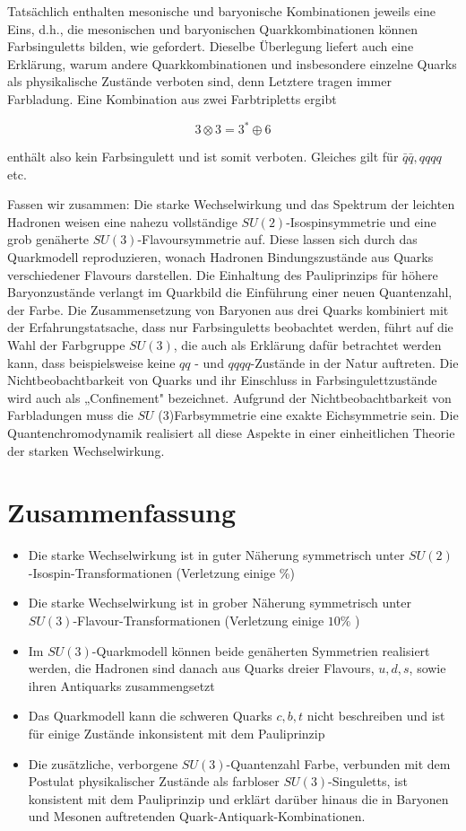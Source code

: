 \documentclass[10pt, letterpaper]{article}
\begin{document}
Tatsächlich enthalten mesonische und baryonische Kombinationen jeweils eine Eins, d.h., die mesonischen und baryonischen Quarkkombinationen können Farbsinguletts bilden, wie gefordert. Dieselbe Überlegung liefert auch eine Erklärung, warum andere Quarkkombinationen und insbesondere einzelne Quarks als physikalische Zustände verboten sind, denn Letztere tragen immer Farbladung. Eine Kombination aus zwei Farbtripletts ergibt

$$
3 \otimes 3=3^{*} \oplus 6
$$

enthält also kein Farbsingulett und ist somit verboten. Gleiches gilt für $\bar{q} \bar{q}, q q q q$ etc.

Fassen wir zusammen: Die starke Wechselwirkung und das Spektrum der leichten Hadronen weisen eine nahezu vollständige $S U(2)$-Isospinsymmetrie und eine grob genäherte $S U(3)$-Flavoursymmetrie auf. Diese lassen sich durch das Quarkmodell reproduzieren, wonach Hadronen Bindungszustände aus Quarks verschiedener Flavours darstellen. Die Einhaltung des Pauliprinzips für höhere Baryonzustände verlangt im Quarkbild die Einführung einer neuen Quantenzahl, der Farbe. Die Zusammensetzung von Baryonen aus drei Quarks kombiniert mit der Erfahrungstatsache, dass nur Farbsinguletts beobachtet werden, führt auf die Wahl der Farbgruppe $S U(3)$, die auch als Erklärung dafür betrachtet werden kann, dass beispielsweise keine $q q$ - und $q q q q$-Zustände in der Natur auftreten. Die Nichtbeobachtbarkeit von Quarks und ihr Einschluss in Farbsingulettzustände wird auch als „Confinement" bezeichnet. Aufgrund der Nichtbeobachtbarkeit von Farbladungen muss die $S U$ (3)Farbsymmetrie eine exakte Eichsymmetrie sein. Die Quantenchromodynamik realisiert all diese Aspekte in einer einheitlichen Theorie der starken Wechselwirkung.

\section*{Zusammenfassung}
\begin{itemize}
  \item Die starke Wechselwirkung ist in guter Näherung symmetrisch unter $S U(2)$ -Isospin-Transformationen (Verletzung einige \%)
  \item Die starke Wechselwirkung ist in grober Näherung symmetrisch unter $S U(3)$-Flavour-Transformationen (Verletzung einige $10 \%$ )
  \item Im $S U(3)$-Quarkmodell können beide genäherten Symmetrien realisiert werden, die Hadronen sind danach aus Quarks dreier Flavours, $u, d, s$, sowie ihren Antiquarks zusammengsetzt
  \item Das Quarkmodell kann die schweren Quarks $c, b, t$ nicht beschreiben und ist für einige Zustände inkonsistent mit dem Pauliprinzip
  \item Die zusätzliche, verborgene $S U(3)$-Quantenzahl Farbe, verbunden mit dem Postulat physikalischer Zustände als farbloser $S U(3)$-Singuletts, ist konsistent mit dem Pauliprinzip und erklärt darüber hinaus die in Baryonen und Mesonen auftretenden Quark-Antiquark-Kombinationen.
\end{itemize}
\end{document}
